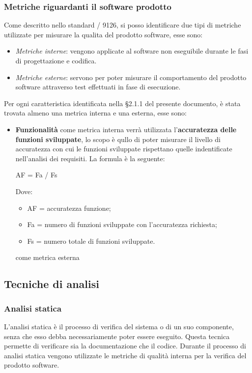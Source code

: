     \subsubsection{Metriche riguardanti il software prodotto}
    Come descritto nello standard / 9126, si posso identificare due tipi di metriche utilizzate per misurare la qualita del prodotto software, esse sono:
    \begin{itemize}
      \item \emph{Metriche interne}: vengono applicate al software non eseguibile durante le fasi di progettazione e codifica.
      \item \emph{Metriche esterne}: servono per poter misurare il comportamento del prodotto software attraverso test effettuati in fase di esecuzione.
    \end{itemize}
    Per ogni caratteristica identificata nella \S2.1.1 del presente documento, è stata trovata almeno una metrica interna e una esterna, esse sono:
    \begin{itemize}
      \item \textbf{Funzionalità} come metrica interna verrà utilizzata l'\textbf{accuratezza delle funzioni sviluppate}, lo scopo è qullo di poter misurare
      il livello di accuratezza con cui le funzioni sviluppate rispettano quelle indentificate nell'analisi dei requisiti. La formula è la seguente:
      \begin{center}
        AF = Fa / Fs
      \end{center}
      Dove:
      \begin{itemize}
        \item AF = accuratezza funzione;
        \item Fa = numero di funzioni sviluppate con l'accuratezza richiesta;
        \item Fs = numero totale di funzioni sviluppate.
      \end{itemize}
      come metrica esterna 
    \end{itemize}






  \subsection{Tecniche di analisi}
    \subsubsection{Analisi statica}
    L'analisi statica è il processo di verifica del sistema o di un suo componente, senza che esso debba necessariamente poter essere eseguito.
    Questa tecnica permette di verificare sia la documentazione che il codice.
    Durante il processo di analisi statica vengono utilizzate le metriche di qualità interna per la verifica del prodotto software.
